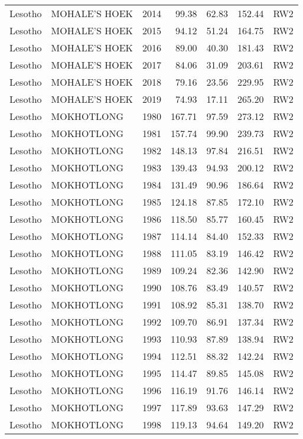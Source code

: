 \begin{longtable}{lllrrrl}
  Lesotho & MOHALE'S HOEK & 2014 & 99.38 & 62.83 & 152.44 & RW2 \\ 
  Lesotho & MOHALE'S HOEK & 2015 & 94.12 & 51.24 & 164.75 & RW2 \\ 
  Lesotho & MOHALE'S HOEK & 2016 & 89.00 & 40.30 & 181.43 & RW2 \\ 
  Lesotho & MOHALE'S HOEK & 2017 & 84.06 & 31.09 & 203.61 & RW2 \\ 
  Lesotho & MOHALE'S HOEK & 2018 & 79.16 & 23.56 & 229.95 & RW2 \\ 
  Lesotho & MOHALE'S HOEK & 2019 & 74.93 & 17.11 & 265.20 & RW2 \\ 
  Lesotho & MOKHOTLONG & 1980 & 167.71 & 97.59 & 273.12 & RW2 \\ 
  Lesotho & MOKHOTLONG & 1981 & 157.74 & 99.90 & 239.73 & RW2 \\ 
  Lesotho & MOKHOTLONG & 1982 & 148.13 & 97.84 & 216.51 & RW2 \\ 
  Lesotho & MOKHOTLONG & 1983 & 139.43 & 94.93 & 200.12 & RW2 \\ 
  Lesotho & MOKHOTLONG & 1984 & 131.49 & 90.96 & 186.64 & RW2 \\ 
  Lesotho & MOKHOTLONG & 1985 & 124.18 & 87.85 & 172.10 & RW2 \\ 
  Lesotho & MOKHOTLONG & 1986 & 118.50 & 85.77 & 160.45 & RW2 \\ 
  Lesotho & MOKHOTLONG & 1987 & 114.14 & 84.40 & 152.33 & RW2 \\ 
  Lesotho & MOKHOTLONG & 1988 & 111.05 & 83.19 & 146.42 & RW2 \\ 
  Lesotho & MOKHOTLONG & 1989 & 109.24 & 82.36 & 142.90 & RW2 \\ 
  Lesotho & MOKHOTLONG & 1990 & 108.76 & 83.49 & 140.57 & RW2 \\ 
  Lesotho & MOKHOTLONG & 1991 & 108.92 & 85.31 & 138.70 & RW2 \\ 
  Lesotho & MOKHOTLONG & 1992 & 109.70 & 86.91 & 137.34 & RW2 \\ 
  Lesotho & MOKHOTLONG & 1993 & 110.93 & 87.89 & 138.94 & RW2 \\ 
  Lesotho & MOKHOTLONG & 1994 & 112.51 & 88.32 & 142.24 & RW2 \\ 
  Lesotho & MOKHOTLONG & 1995 & 114.47 & 89.85 & 145.08 & RW2 \\ 
  Lesotho & MOKHOTLONG & 1996 & 116.19 & 91.76 & 146.14 & RW2 \\ 
  Lesotho & MOKHOTLONG & 1997 & 117.89 & 93.63 & 147.29 & RW2 \\ 
  Lesotho & MOKHOTLONG & 1998 & 119.13 & 94.64 & 149.20 & RW2 \\ 

\end{longtable}
